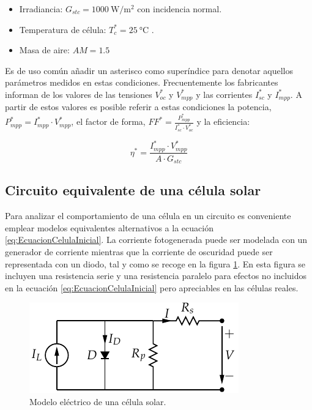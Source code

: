 \begin{itemize}
\item Irradiancia: $G_{stc}=\SI{1000}{\watt\per\meter\squared}$
con incidencia normal.
\item Temperatura de célula: $T_{c}^{*}=\SI{25}{\celsius}$
.
\item Masa de aire: $AM=1.5$
\end{itemize}

Es de uso común añadir un asterisco como superíndice para denotar
aquellos parámetros medidos en estas condiciones. Frecuentemente los
fabricantes informan de los valores de las tensiones $V_{oc}^{*}$
y $V_{mpp}^{*}$ y las corrientes $I_{sc}^{*}$ y $I_{mpp}^{*}$.
A partir de estos valores es posible referir a estas condiciones la
potencia, $P_{mpp}^{*}=I_{mpp}^{*}\cdot V_{mpp}^{*}$, el factor de
forma, $FF^{*}=\frac{P_{mpp}^{*}}{I_{sc}^{*}\cdot V_{oc}^{*}}$
y la eficiencia:

\begin{equation}
\eta^{*}=\frac{I_{mpp}^{*}\cdot V_{mpp}^{*}}{A\cdot G_{stc}}
\label{eq:EficienciaCelula_STC}
\end{equation}


\subsection{Circuito equivalente de una célula solar}

Para analizar el comportamiento de una célula en un circuito es conveniente
emplear modelos equivalentes alternativos a la ecuación \ref{eq:EcuacionCelulaInicial}.
La corriente fotogenerada puede ser modelada con un generador de corriente
mientras que la corriente de oscuridad puede ser representada con
un diodo, tal y como se recoge en la figura \ref{fig:M=0000F3deloCelula}.
En esta figura se incluyen una resistencia serie y una resistencia
paralelo para efectos no incluidos en la ecuación \ref{eq:EcuacionCelulaInicial}
pero apreciables en las células reales. 

%
\begin{figure}
\includegraphics{../figs/ModeloElectricoCelulaSolar}\caption{Modelo eléctrico de una célula solar.\label{fig:M=0000F3deloCelula}}

\end{figure}


